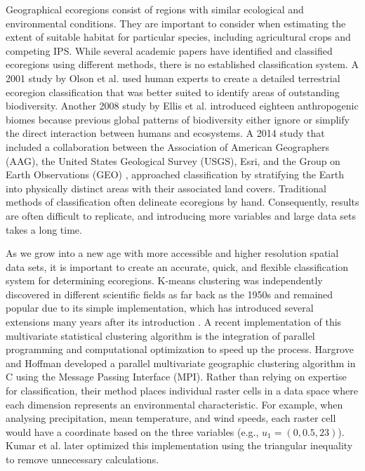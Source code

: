 \documentclass[a4paper,10pt]{article}
\begin{document}
Geographical ecoregions consist of regions with similar ecological and environmental conditions. They are important to consider when estimating the extent of suitable habitat for particular species, including agricultural crops and competing IPS. While several academic papers have identified and classified ecoregions using different methods, there is no established classification system. A 2001 study by Olson et al. \cite{olson2001terrestrial} used human experts to create a detailed terrestrial ecoregion classification that was better suited to identify areas of outstanding biodiversity. Another 2008 study by Ellis et al. \cite{ellis2008putting} introduced eighteen anthropogenic biomes because previous global patterns of biodiversity either ignore or simplify the direct interaction between humans and ecosystems. A 2014 study that included a collaboration between the Association of American Geographers (AAG), the United States Geological Survey (USGS), Esri, and the Group on Earth Observations (GEO) \cite{globaleco2014a}, approached classification by stratifying the Earth into physically distinct areas with their associated land covers. Traditional methods of classification often delineate ecoregions by hand. Consequently, results are often difficult to replicate, and introducing more variables and large data sets takes a long time.


As we grow into a new age with more accessible and higher resolution spatial data sets, it is important to create an accurate, quick, and flexible classification system for determining ecoregions. K-means clustering was independently discovered in different scientific fields as far back as the 1950s and remained popular due to its simple implementation, which has introduced several extensions many years after its introduction \cite{cuomo2019a,dunn1973a,jain2010data,pelleg1999accelerating,scholkopf1998nonlinear,tang2017parallel}. A recent implementation of this multivariate statistical clustering algorithm is the integration of parallel programming and computational optimization to speed up the process. Hargrove and Hoffman \cite{hargrove1999using} developed a parallel multivariate geographic clustering algorithm in C using the Message Passing Interface (MPI). Rather than relying on expertise for classification, their method places individual raster cells in a data space where each dimension represents an environmental characteristic.  For example, when analysing precipitation, mean temperature, and wind speeds, each raster cell would have a coordinate based on the three variables (e.g., $u_{1} = (0, 0.5, 23)$). Kumar et al. \cite{kumar2011parallel} later optimized this implementation using the triangular inequality to remove unnecessary calculations.
\end{document}
